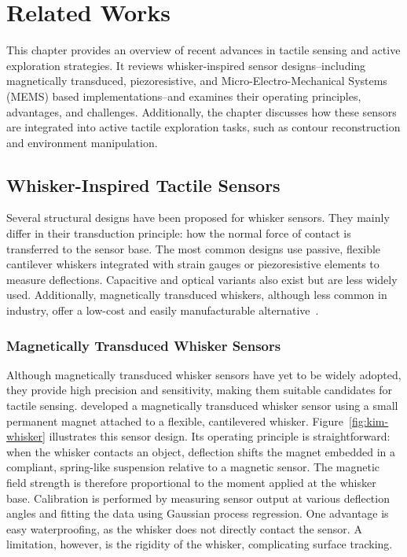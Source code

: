 

\chapter{Related Works}

This chapter provides an overview of recent advances in tactile sensing and active exploration strategies.
It reviews whisker-inspired sensor designs--including magnetically transduced, piezoresistive, and Micro-Electro-Mechanical Systems (MEMS) based implementations--and examines their operating principles, advantages, and challenges.
Additionally, the chapter discusses how these sensors are integrated into active tactile exploration tasks, such as contour reconstruction and environment manipulation.


\section{Whisker-Inspired Tactile Sensors}
Several structural designs have been proposed for whisker sensors.
They mainly differ in their transduction principle: how the normal force of contact is transferred to the sensor base.
The most common designs use passive, flexible cantilever whiskers integrated with strain gauges or piezoresistive elements to measure deflections.
Capacitive and optical variants also exist but are less widely used.
Additionally, magnetically transduced whiskers, although less common in industry, offer a low-cost and easily manufacturable alternative~\cite{8968518}.

\subsection{Magnetically Transduced Whisker Sensors}
Although magnetically transduced whisker sensors have yet to be widely adopted, they provide high precision and sensitivity, making them suitable candidates for tactile sensing.
\textcite{8968518} developed a magnetically transduced whisker sensor using a small permanent magnet attached to a flexible, cantilevered whisker.
Figure~\ref{fig:kim-whisker} illustrates this sensor design.
Its operating principle is straightforward: when the whisker contacts an object, deflection shifts the magnet embedded in a compliant, spring-like suspension relative to a magnetic sensor.
The magnetic field strength is therefore proportional to the moment applied at the whisker base.
Calibration is performed by measuring sensor output at various deflection angles and fitting the data using Gaussian process regression.
One advantage is easy waterproofing, as the whisker does not directly contact the sensor.
A limitation, however, is the rigidity of the whisker, complicating surface tracking.

